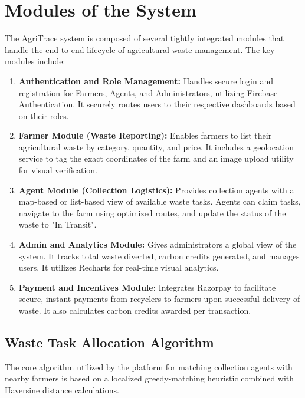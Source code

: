 \documentclass[a4paper,12pt,oneside]{report}
\let\originalitem\item
\renewcommand{\item}{\Needspace{10\baselineskip}\originalitem}
\begin{document}
\section{Modules of the System}
\noindent The AgriTrace system is composed of several tightly integrated modules that handle the end-to-end lifecycle of agricultural waste management. The key modules include:
\begin{enumerate}
    \item \textbf{Authentication and Role Management:} Handles secure login and registration for Farmers, Agents, and Administrators, utilizing Firebase Authentication. It securely routes users to their respective dashboards based on their roles.
    \item \textbf{Farmer Module (Waste Reporting):} Enables farmers to list their agricultural waste by category, quantity, and price. It includes a geolocation service to tag the exact coordinates of the farm and an image upload utility for visual verification.
    \item \textbf{Agent Module (Collection Logistics):} Provides collection agents with a map-based or list-based view of available waste tasks. Agents can claim tasks, navigate to the farm using optimized routes, and update the status of the waste to "In Transit".
    \item \textbf{Admin and Analytics Module:} Gives administrators a global view of the system. It tracks total waste diverted, carbon credits generated, and manages users. It utilizes Recharts for real-time visual analytics.
    \item \textbf{Payment and Incentives Module:} Integrates Razorpay to facilitate secure, instant payments from recyclers to farmers upon successful delivery of waste. It also calculates carbon credits awarded per transaction.
\end{enumerate}

\subsection{Waste Task Allocation Algorithm}
\noindent The core algorithm utilized by the platform for matching collection agents with nearby farmers is based on a localized greedy-matching heuristic combined with Haversine distance calculations.
\end{document}
